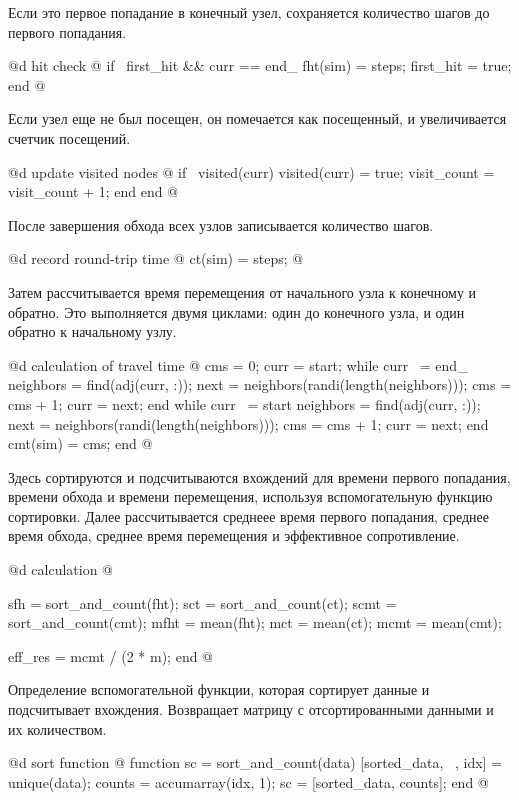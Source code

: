 \documentclass[utf8x]{G7-32} %
\begin{document}
Если это первое попадание в конечный узел, сохраняется количество шагов до первого попадания.

@d hit check @{
            if ~first_hit && curr == end_
                fht(sim) = steps;
                first_hit = true;
            end
@}

Если узел еще не был посещен, он помечается как посещенный, и увеличивается счетчик посещений.

@d update visited nodes @{
            if ~visited(curr)
                visited(curr) = true;
                visit_count = visit_count + 1;
            end
        end
@}

После завершения обхода всех узлов записывается количество шагов.

@d record round-trip time @{
        ct(sim) = steps;
@}

Затем рассчитывается время перемещения от начального узла к конечному и обратно. Это выполняется двумя циклами: один до конечного узла, и один обратно к начальному узлу.

@d calculation of travel time @{
        cms = 0;
        curr = start;
        while curr ~= end_
            neighbors = find(adj(curr, :));
            next = neighbors(randi(length(neighbors)));
            cms = cms + 1;
            curr = next;
        end
        while curr ~= start
            neighbors = find(adj(curr, :));
            next = neighbors(randi(length(neighbors)));
            cms = cms + 1;
            curr = next;
        end
        cmt(sim) = cms;
    end
@}

Здесь сортируются и подсчитываются вхождений для времени первого попадания, времени обхода и времени перемещения, используя вспомогательную функцию сортировки. Далее рассчитывается среднеее время первого попадания, среднее время обхода, среднее время перемещения и эффективное сопротивление.

@d calculation @{
    sfh = sort_and_count(fht);
    sct = sort_and_count(ct);
    scmt = sort_and_count(cmt);
    mfht = mean(fht);
    mct = mean(ct);
    mcmt = mean(cmt);

    eff_res = mcmt / (2 * m);
end
@}

Определение вспомогательной функции, которая сортирует данные и подсчитывает вхождения. Возвращает матрицу с отсортированными данными и их количеством.

@d sort function @{
function sc = sort_and_count(data)
    [sorted_data, ~, idx] = unique(data);
    counts = accumarray(idx, 1);
    sc = [sorted_data, counts];
end
@}
\end{document}
